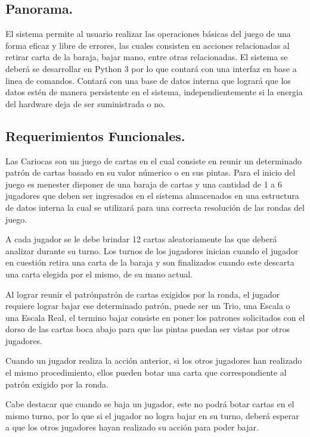 \documentclass[60pt]{article}
\begin{document}
\subsection{Panorama.}\label{cap:panorama}
El sistema permite al usuario realizar las operaciones básicas del juego de una forma eficaz y libre de errores, las cuales consisten en acciones relacionadas al retirar carta de la \gls{baraja}, bajar mano, entre otras relacionadas. El sistema se deberá se desarrollar en Python 3 por lo que contará con una interfaz en base a linea de comandos. Contará con una base de datos interna que logrará que los datos estén de manera persistente en el sistema, independientemente si la energia del hardware deja de ser suministrada o no.
\subsection{Requerimientos Funcionales.}\label{cap:requerimientos-funcionales}
Las Cariocas son un juego de cartas en el cual consiste en reunir un determinado \gls{patrón} de cartas basado en su valor númerico o en sus pintas. Para el inicio del juego es menester disponer de una \gls{baraja} de cartas y una cantidad de 1 a 6 jugadores que deben ser ingresados en el sistema almacenados en una estructura de datos interna la cual se utilizará para una correcta resolución de las rondas del juego. 

A cada jugador se le debe brindar 12 cartas aleatoriamente las que deberá analizar durante su turno. Los turnos de los jugadores inician cuando el jugador en cuestión retira una carta de la \gls{baraja} y son finalizados cuando este descarta una carta elegida por el mismo, de su mano actual.

Al lograr reunir el patrón\Gls{patrón} de cartas exigidos por la ronda, el jugador requiere lograr bajar ese determinado \gls{patrón}, puede ser un Trio, una Escala o una Escala Real, el termino bajar consiste en poner los patrones solicitados con el dorso de las cartas boca abajo para que las pintas puedan ser vistas por otros jugadores.

Cuando un jugador realiza la acción anterior, si los otros jugadores han realizado el mismo procedimiento, ellos pueden botar una carta que correspondiente al \gls{patrón} exigido por la ronda.

Cabe destacar que cuando se baja un jugador, este no podrá botar cartas en el mismo turno, por lo que si el jugador no logra bajar en su turno, deberá esperar a que los otros jugadores hayan realizado su acción para poder bajar.
\end{document}
